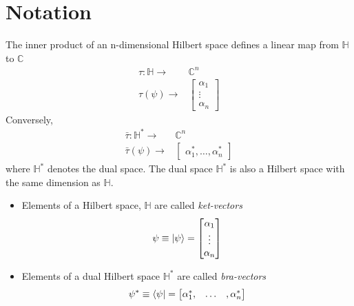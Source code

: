 \section{Notation}
\begin{definition}
The inner product of an n-dimensional Hilbert space defines a linear map from $\mathbb{H}$ to $\mathbb{C}$
\begin{align*}
  \tau: \mathbb{H}\longrightarrow& \mathbb{C}^{n} \\
  \tau(\psi) \longrightarrow& \begin{bmatrix}
           \alpha_{1} \\
           \vdots \\
           \alpha_{n}
         \end{bmatrix}
\end{align*}  
Conversely, 
\begin{align*}
  \bar{\tau}: \mathbb{H}^{*}\longrightarrow& \mathbb{C}^{n} \\
  \bar{\tau}(\psi)\longrightarrow& 
         \begin{bmatrix}
           \alpha_{1}^{*}, \hdots, \alpha_{n}^{*}
         \end{bmatrix}
\end{align*} 
where $\mathbb{H}^{*}$ denotes the dual space. The dual space $\mathbb{H}^{*}$ is also a Hilbert space with the same dimension as $\mathbb{H}$. 
\begin{itemize}
    \item Elements of a Hilbert space, $\mathbb{H}$ are called \textit{ket-vectors} 
\begin{equation}
    \psi \equiv \ket{\psi} =  \begin{bmatrix}
           \alpha_{1} \\
           \vdots \\
           \alpha_{n}
         \end{bmatrix}
\end{equation}
\item Elements of a dual Hilbert space $\mathbb{H}^{*}$ are called \textit{bra-vectors}
\begin{equation}
    \psi^{*} \equiv \bra{\psi} =  \begin{bmatrix}
           \alpha_{1}^{*}, & \hdots &, \alpha_{n}^{*}
         \end{bmatrix}
\end{equation}
\end{itemize}
\end{definition}

